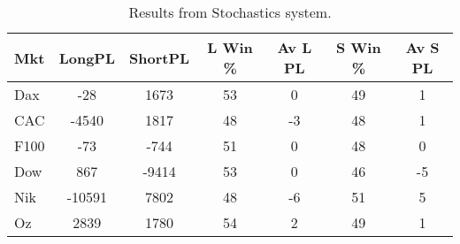 \begin{table}[ht]
\centering
\caption[Stochastics system]{Results from Stochastics system.} 
\label{tab:stoch_results}
\begin{tabular}{lcccccc}
  \toprule Mkt & LongPL & ShortPL & L Win \% & Av L PL & S Win \% & Av S PL \\ 
  \midrule Dax & -28 & 1673 & 53 & 0 & 49 & 1 \\ 
  CAC & -4540 & 1817 & 48 & -3 & 48 & 1 \\ 
  F100 & -73 & -744 & 51 & 0 & 48 & 0 \\ 
  Dow & 867 & -9414 & 53 & 0 & 46 & -5 \\ 
  Nik & -10591 & 7802 & 48 & -6 & 51 & 5 \\ 
  Oz & 2839 & 1780 & 54 & 2 & 49 & 1 \\ 
   \bottomrule \end{tabular}
\end{table}
